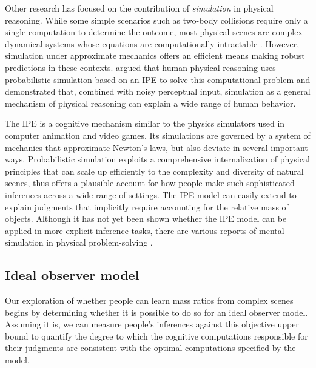 \documentclass[10pt,letterpaper]{article}
\begin{document}
Other research has focused on the contribution of \textit{simulation}
in physical reasoning. While some simple scenarios such as two-body
collisions require only a single computation to determine the outcome,
most physical scenes are complex dynamical systems whose equations are
computationally intractable \cite{Cubitt2010}. However, simulation
under approximate mechanics offers an efficient means making robust
predictions in these contexts.  argued that human
physical reasoning uses probabilistic simulation based on an IPE to
solve this computational problem and demonstrated that, combined with
noisy perceptual input, simulation as a general mechanism of physical
reasoning can explain a wide range of human behavior.

The IPE is a cognitive mechanism similar to the physics simulators
used in computer animation and video games. Its simulations are
governed by a system of mechanics that approximate Newton's laws, but
also deviate in several important ways. Probabilistic simulation
exploits a comprehensive internalization of physical principles that
can scale up efficiently to the complexity and diversity of natural
scenes, thus offers a plausible account for how people make such
sophisticated inferences across a wide range of settings. The IPE
model can easily extend to explain judgments that implicitly require
accounting for the relative mass of objects.  Although it has not yet
been shown whether the IPE model can be applied in more explicit
inference tasks, there are various reports of mental simulation in
physical problem-solving \cite{Hegarty2004,Schwartz1999}.

\subsection{Ideal observer model}
Our exploration of whether people can learn mass ratios from complex
scenes begins by determining whether it is possible to do so for an
ideal observer model. Assuming it is, we can measure people's
inferences against this objective upper bound to quantify the degree
to which the cognitive computations responsible for their judgments
are consistent with the optimal computations specified by the model.
\end{document}
